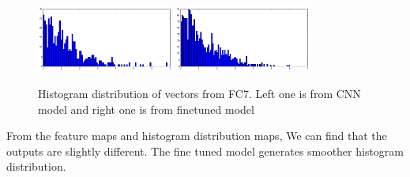 \begin{figure}[!htb]
    \centering
	\includegraphics[width=0.4\textwidth]{sunny2_hist_caffe_fc7.png}
	\includegraphics[width=0.4\textwidth]{sunny2_hist_spp_fc7.png}
    \caption{Histogram distribution of vectors from FC7. Left one is from CNN model and right one is from finetuned model}%
    \label{fig:fc7_hist_output}%
\end{figure}

From the feature maps and histogram distribution maps, We can find that the outputs are slightly different. The fine tuned model generates smoother histogram distribution. 